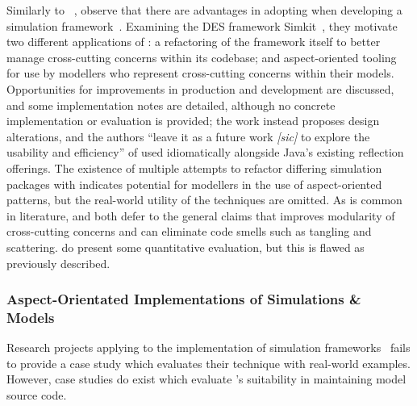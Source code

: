Similarly to
\citeauthor{chibani2019using}~\cite{chibani2019using,chibani2013toward,chibani2014practical},
\citeauthor{DEVSaspectorientation2008aksu} observe that there are advantages in
adopting \aspectorientation{} when developing a simulation
framework~\cite{DEVSaspectorientation2008aksu}. Examining the DES framework
Simkit~\cite{introducing_simkit_des}, they motivate two different applications
of \aspectorientation{}: a refactoring of the framework itself to better manage
cross-cutting concerns within its codebase; and aspect-oriented tooling for use
by modellers who represent cross-cutting concerns within their models.
Opportunities for improvements in production and development are discussed, and
some implementation notes are detailed, although no concrete implementation or
evaluation is provided; the work instead proposes design alterations, and the
authors ``leave it as a future work \emph{[sic]} to explore the usability and
efficiency'' of \aspectorientation{} used idiomatically alongside Java's
existing reflection offerings. The existence of multiple attempts to refactor
differing simulation packages with \aspectorientation{} indicates potential for
modellers in the use of aspect-oriented patterns, but the real-world utility of
the techniques are omitted. As is common in \aspectorientation{} literature,
\citeauthor{chibani2019using} and \citeauthor{DEVSaspectorientation2008aksu}
both defer to the general claims that \aspectorientation{} improves modularity
of cross-cutting concerns and can eliminate code smells such as tangling and
scattering. \citeauthor{chibani2014practical} do present some
quantitative evaluation, but this is flawed as previously described.



\subsubsection{Aspect-Orientated Implementations of Simulations \& Models}

Research projects applying \aspectorientation{} to the implementation of
simulation frameworks~\cite{chibani} fails to provide a case study which evaluates
their technique with real-world examples. However, case studies do exist which
evaluate \aspectorientation{}'s suitability in maintaining model source code.

